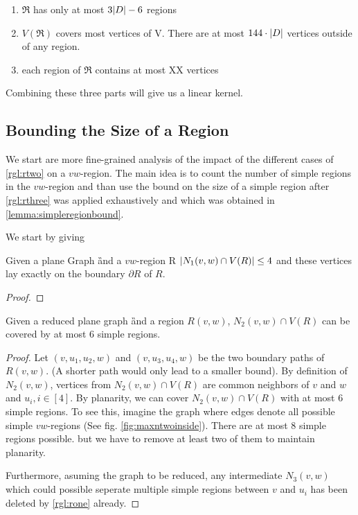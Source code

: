 \begin{enumerate}[topsep=0pt,itemsep=-1ex,partopsep=1ex,parsep=1ex]
    \item $\mathfrak{R}$ has only at most $3 \abs{D} - 6$ regions
    \item $V(\mathfrak{R})$ covers most vertices of V. There are at most $144 \cdot \abs{D}$ vertices outside of any region.
    \item each region of $\mathfrak{R}$ contains at most XX vertices
\end{enumerate}

Combining these three parts will give us a linear kernel.

\subsection{Bounding the Size of a Region}

We start are more fine-grained analysis of the impact of the different cases of \cref{rgl:rtwo} on a $vw$-region. The main idea is to count the number of simple regions in the $vw$-region and than use the bound on the size of a simple region after \cref{rgl:rthree} was applied exhaustively and which was obtained in \cref{lemma:simpleregionbound}.   

We start by giving 

\begin{lemma}\label{lemma:nonecover}
    Given a plane Graph \G and a $vw$-region R $\abs{N_1(v,w) \cap V(R)} \leq 4$ and these vertices lay exactly on the boundary $\partial R$ of $R$. 
\end{lemma}
\begin{proof}

\end{proof}

\begin{lemma}\cite[See Fact 5]{Garnero2018}\label{lemma:ntwocover}
    Given a reduced plane graph \G and a region $R(v,w)$, $N_2(v,w) \cap V(R)$ can be covered by at most 6 simple regions.
\end{lemma}
\begin{proof}
    Let $(v,u_1, u_2,w)$ and $(v, u_3, u_4, w)$ be the two boundary paths of $R(v,w)$. (A shorter path would only lead to a smaller bound).
    By definition of $N_2(v,w)$, vertices from $N_2(v,w) \cap V(R)$ are common neighbors of $v$ and $w$ and $u_i, i \in [4]$. By planarity, we can cover $N_2(v,w) \cap V(R)$ with at most 6 simple regions. To see this, imagine the graph where edges denote all possible simple $vw$-regions (See fig. \ref{fig:maxntwoinside}). There are at most 8 simple regions possible. but we have to remove at least two of them to maintain planarity.
    
    Furthermore, asuming the graph to be reduced, any intermediate $N_3(v,w)$ which could possible seperate multiple simple regions between $v$ and $u_i$ has been deleted by \cref{rgl:rone} already.
\end{proof}


